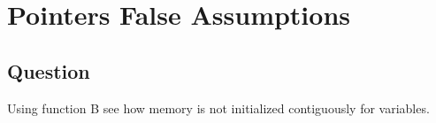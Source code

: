 \section{Pointers False Assumptions}
    \subsection*{Question}
        Using function B see how memory is not initialized contiguously for 
        variables.